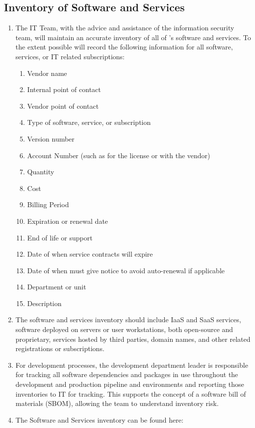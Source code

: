 \documentclass[../main.tex]{subfiles}
\begin{document}
\subsection{Inventory of Software and Services}
\begin{enumerate}
    \item The IT Team, with the advice and assistance of the information security team, will maintain an accurate inventory of all of \CompanyName's software and services.
    To the extent possible \CompanyName{} will record the following information for all software, services, or IT related subscriptions:
    \begin{enumerate}
        \item Vendor name
        \item Internal point of contact
        \item Vendor point of contact
        \item Type of software, service, or subscription
        \item Version number
        \item Account Number (such as for the license or with the vendor)
        \item Quantity
        \item Cost
        \item Billing Period
        \item Expiration or renewal date
        \item End of life or support
        \item Date of when service contracts will expire
        \item Date of when \CompanyName{} must give notice to avoid auto-renewal if applicable
        \item Department or unit
        \item Description
    \end{enumerate}
    \item The software and services inventory should include IaaS and SaaS services, software deployed on servers or user workstations, both open-source and proprietary, services hosted
    by third parties, domain names, and other related registrations or subscriptions.
    \item For development processes, the development department leader is responsible for tracking all software dependencies and packages in use throughout the development and production
    pipeline and environments and reporting those inventories to IT for tracking. This supports the concept of a software bill of materials (SBOM), allowing the team to understand inventory risk.
    \item The Software and Services inventory can be found here: \AssetInventory
\end{enumerate}
\end{document}
